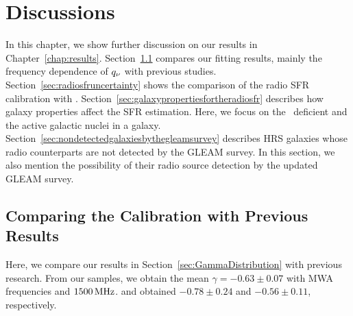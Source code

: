 \chapter{Discussions}\label{chap:discussions}
\begin{chapabstract}

In this chapter, we show further discussion on our results in Chapter~\ref{chap:results}.
Section~\ref{sec:comparingthecalibration} compares our fitting results, mainly the frequency dependence of $q_{\nu}$ with previous studies.
Section~\ref{sec:radiosfruncertainty} shows the comparison of the radio SFR calibration with \citet{CalistroRivera2017a}.
Section~\ref{sec:galaxypropertiesfortheradiosfr} describes how galaxy properties affect the SFR estimation.
Here, we focus on the \nh~deficient and the active galactic nuclei in a galaxy.
Section~\ref{sec:nondetectedgalaxiesbythegleamsurvey} describes HRS galaxies whose radio counterparts are not detected by the GLEAM survey.
In this section, we also mention the possibility of their radio source detection by the updated GLEAM survey.

\end{chapabstract}

\section{Comparing the Calibration with Previous Results}\label{sec:comparingthecalibration}

Here, we compare our results in Section~\ref{sec:GammaDistribution} with previous research.
From our samples, we obtain the mean $\gamma=-0.63 \pm 0.07$ with MWA frequencies and $1500\,\mathrm{MHz}$.
\citet{CalistroRivera2017a} and \citet{Chyzy2018} obtained $-0.78 \pm 0.24$ and $-0.56 \pm 0.11$, respectively.


